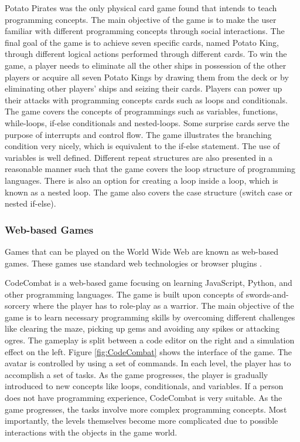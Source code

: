 Potato Pirates \cite{PotatoPirates} was the only physical card game found that intends to teach programming concepts. The main objective of the game is to make the user familiar with different programming concepts through social interactions. The final goal of the game is to achieve seven specific cards, named Potato King, through different logical actions performed through different cards. To win the game, a player needs to eliminate all the other ships in possession of the other players or acquire all seven Potato Kings by drawing them from the deck or by eliminating other players’ ships and seizing their cards. Players can power up their attacks with programming concepts cards such as loops and conditionals. The game covers the concepts of programmings such as variables, functions, while-loops, if-else conditionals and nested-loops. Some surprise cards serve the purpose of interrupts and control flow. The game illustrates the branching condition very nicely, which is equivalent to the if-else statement. The use of variables is well defined. Different repeat structures are also presented in a reasonable manner such that the game covers the loop structure of programming languages. There is also an option for creating a loop inside a loop, which is known as a nested loop. The game also covers the case structure (switch case or nested if-else).

\subsubsection{Web-based Games}

Games that can be played on the World Wide Web are known as web-based games. These games use standard web technologies or browser plugins \cite{webbasedgames}.

CodeCombat \cite{CodeCombat} is a web-based game focusing on learning JavaScript, Python, and other programming languages. The game is built upon concepts of swords-and-sorcery where the player has to role-play as a warrior. The main objective of the game is to learn necessary programming skills by overcoming different challenges like clearing the maze, picking up gems and avoiding any spikes or attacking ogres. The gameplay is split between a code editor on the right and a simulation effect on the left. Figure \ref{fig:CodeCombat} shows the interface of the game. The avatar is controlled by using a set of commands.  In each level, the player has to accomplish a set of tasks. As the game progresses, the player is gradually introduced to new concepts like loops, conditionals, and variables. If a person does not have programming experience, CodeCombat is very suitable. As the game progresses, the tasks involve more complex programming concepts. Most importantly, the levels themselves become more complicated due to possible interactions with the objects in the game world.\\

